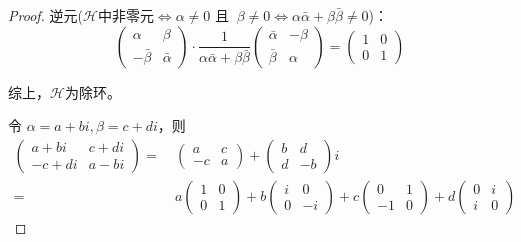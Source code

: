 \documentclass[12pt, a4paper, oneside]{ctexart}
\begin{document}
\begin{proof}
    逆元($\mathcal{H}\text{中非零元}\iff \alpha\neq 0\text{ 且 }\ \beta\neq 0\iff\alpha\bar{\alpha}+\beta\bar{\beta}\neq 0$)：
    \begin{equation*}
        \begin{pmatrix}
            \alpha&\beta\\-\bar{\beta}&\bar{\alpha}
        \end{pmatrix}\cdot
        \frac{1}{\alpha\bar{\alpha}+\beta\bar{\beta}}\begin{pmatrix}
            \bar{\alpha}&-\beta\\
            \bar{\beta}&\alpha
        \end{pmatrix}=\begin{pmatrix}
            1&0\\0&1
        \end{pmatrix}
    \end{equation*}

    综上，$\mathcal{H}$为除环。

    令 $\alpha = a+bi, \beta = c+di$，则
    \begin{equation*}
        \begin{aligned}
            \begin{pmatrix}
                a+bi&c+di\\-c+di&a-bi
            \end{pmatrix}
            =&\ \begin{pmatrix}
                a&c\\-c&a
            \end{pmatrix}
            +\begin{pmatrix}
                b&d\\d&-b
            \end{pmatrix}
            i\\
            =&\ a\begin{pmatrix}
                1&0\\0&1
            \end{pmatrix}
            +b\begin{pmatrix}
                i&0\\0&-i
            \end{pmatrix}
            +c\begin{pmatrix}
                0&1\\-1&0
            \end{pmatrix}
            +d\begin{pmatrix}
                0&i\\i&0
            \end{pmatrix}
        \end{aligned}
    \end{equation*}


\end{proof}
\end{document}
